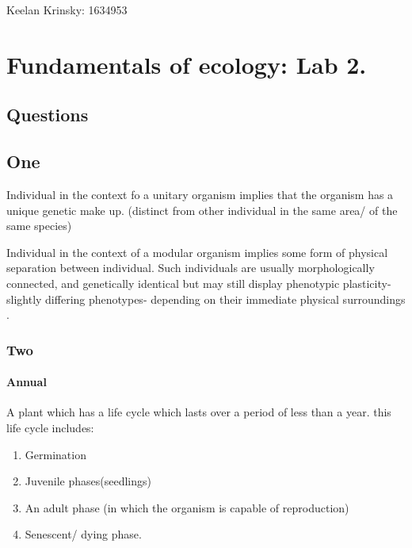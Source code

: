 \documentclass[]{article}
\date{}
\providecommand{\tightlist}{%
  \setlength{\itemsep}{0pt}\setlength{\parskip}{0pt}}
\let\oldparagraph\paragraph
\renewcommand{\paragraph}[1]{\oldparagraph{#1}\mbox{}}
\begin{document}
Keelan Krinsky: 1634953

\hypertarget{fundamentals-of-ecology-lab-2.}{%
\section{Fundamentals of ecology: Lab
2.}\label{fundamentals-of-ecology-lab-2.}}

\hypertarget{questions}{%
\subsection{Questions}\label{questions}}

\hypertarget{one}{%
\subsection{One}\label{one}}

Individual in the context fo a unitary organism implies that the
organism has a unique genetic make up. (distinct from other individual
in the same area/ of the same species)

Individual in the context of a modular organism implies some form of
physical separation between individual. Such individuals are usually
morphologically connected, and genetically identical but may still
display phenotypic plasticity-slightly differing phenotypes- depending
on their immediate physical surroundings .

\hypertarget{two}{%
\subsubsection{Two}\label{two}}

\hypertarget{annual}{%
\paragraph{Annual}\label{annual}}

A plant which has a life cycle which lasts over a period of less than a
year. this life cycle includes:

\begin{enumerate}
\def\labelenumi{\arabic{enumi}.}
\tightlist
\item
  Germination
\item
  Juvenile phases(seedlings)
\item
  An adult phase (in which the organism is capable of reproduction)
\item
  Senescent/ dying phase.
\end{enumerate}
\end{document}
